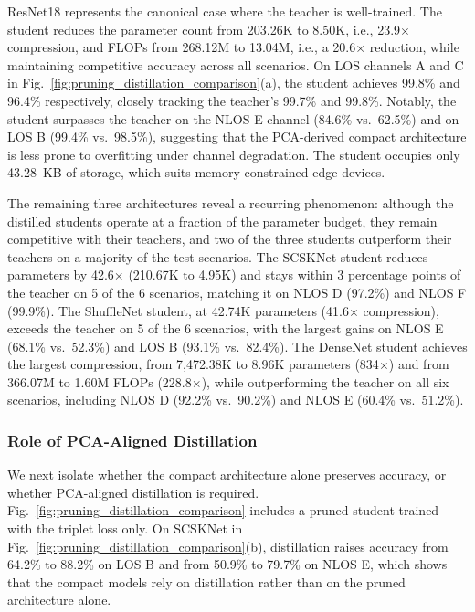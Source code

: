 \documentclass[journal,comsoc]{IEEEtran}
\begin{document}
ResNet18 represents the canonical case where the teacher is well-trained.
The student reduces the parameter count from 203.26K to 8.50K, i.e., 23.9$\times$ compression, and FLOPs from 268.12M to 13.04M, i.e., a 20.6$\times$ reduction, while maintaining competitive accuracy across all scenarios.
On LOS channels A and C in Fig.~\ref{fig:pruning_distillation_comparison}(a), the student achieves 99.8\% and 96.4\% respectively, closely tracking the teacher's 99.7\% and 99.8\%.
Notably, the student surpasses the teacher on the NLOS E channel (84.6\% vs.\ 62.5\%) and on LOS B (99.4\% vs.\ 98.5\%), suggesting that the PCA-derived compact architecture is less prone to overfitting under channel degradation.
The student occupies only 43.28~KB of storage, which suits memory-constrained edge devices.

The remaining three architectures reveal a recurring phenomenon: although the distilled students operate at a fraction of the parameter budget, they remain competitive with their teachers, and two of the three students outperform their teachers on a majority of the test scenarios.
The SCSKNet student reduces parameters by 42.6$\times$ (210.67K to 4.95K) and stays within 3 percentage points of the teacher on 5 of the 6 scenarios, matching it on NLOS D (97.2\%) and NLOS F (99.9\%).
The ShuffleNet student, at 42.74K parameters (41.6$\times$ compression), exceeds the teacher on 5 of the 6 scenarios, with the largest gains on NLOS E (68.1\% vs.\ 52.3\%) and LOS B (93.1\% vs.\ 82.4\%).
The DenseNet student achieves the largest compression, from 7,472.38K to 8.96K parameters (834$\times$) and from 366.07M to 1.60M FLOPs (228.8$\times$), while outperforming the teacher on all six scenarios, including NLOS D (92.2\% vs.\ 90.2\%) and NLOS E (60.4\% vs.\ 51.2\%).

\subsubsection{Role of PCA-Aligned Distillation}
\label{subsubsec:distillation_role}

We next isolate whether the compact architecture alone preserves accuracy, or whether PCA-aligned distillation is required.
Fig.~\ref{fig:pruning_distillation_comparison} includes a pruned student trained with the triplet loss only.
On SCSKNet in Fig.~\ref{fig:pruning_distillation_comparison}(b), distillation raises accuracy from 64.2\% to 88.2\% on LOS B and from 50.9\% to 79.7\% on NLOS E, which shows that the compact models rely on distillation rather than on the pruned architecture alone.
\end{document}
